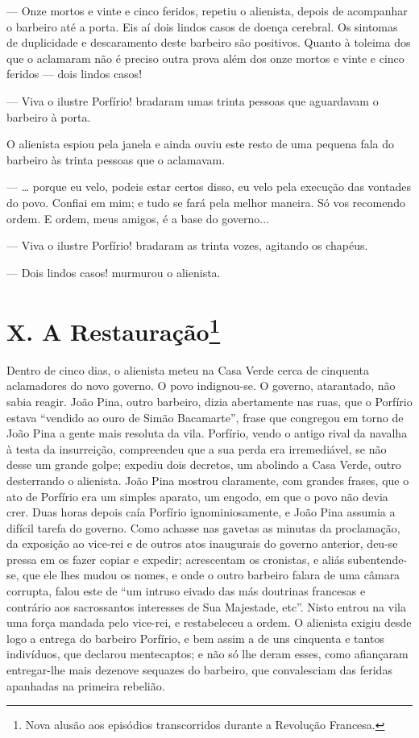 --- Onze mortos e vinte e cinco feridos, repetiu o alienista, depois de
acompanhar o barbeiro até a porta. Eis aí dois lindos casos de doença
cerebral. Os sintomas de duplicidade e descaramento deste barbeiro são
positivos. Quanto à toleima dos que o aclamaram não é preciso outra
prova além dos onze mortos e vinte e cinco feridos --- dois lindos
casos!

--- Viva o ilustre Porfírio! bradaram umas trinta pessoas que aguardavam
o barbeiro à porta.

O alienista espiou pela janela e ainda ouviu este resto de uma pequena
fala do barbeiro às trinta pessoas que o aclamavam.

--- \ldots{} porque eu velo, podeis estar certos disso, eu velo pela
execução das vontades do povo. Confiai em mim; e tudo se fará pela
melhor maneira. Só vos recomendo ordem. E ordem, meus amigos, é a base
do governo...

--- Viva o ilustre Porfírio! bradaram as trinta vozes, agitando os
chapéus.

--- Dois lindos casos! murmurou o alienista.

\chapter{X. A Restauração\footnote{Nova alusão aos episódios transcorridos
  durante a Revolução Francesa.}}

Dentro de cinco dias, o alienista meteu na Casa Verde cerca de cinquenta
aclamadores do novo governo. O povo indignou-se. O governo, atarantado,
não sabia reagir. João Pina, outro barbeiro, dizia abertamente nas ruas,
que o Porfírio estava ``vendido ao ouro de Simão Bacamarte'', frase que
congregou em torno de João Pina a gente mais resoluta da vila. Porfírio,
vendo o antigo rival da navalha à testa da insurreição, compreendeu que
a sua perda era irremediável, se não desse um grande golpe; expediu dois
decretos, um abolindo a Casa Verde, outro desterrando o alienista. João
Pina mostrou claramente, com grandes frases, que o ato de Porfírio era
um simples aparato, um engodo, em que o povo não devia crer. Duas horas
depois caía Porfírio ignominiosamente, e João Pina assumia a difícil
tarefa do governo. Como achasse nas gavetas as minutas da proclamação,
da exposição ao vice-rei e de outros atos inaugurais do governo
anterior, deu-se pressa em os fazer copiar e expedir; acrescentam os
cronistas, e aliás subentende-se, que ele lhes mudou os nomes, e onde o
outro barbeiro falara de uma câmara corrupta, falou este de ``um intruso
eivado das más doutrinas francesas e contrário aos sacrossantos
interesses de Sua Majestade, etc''. Nisto entrou na vila uma força
mandada pelo vice-rei, e restabeleceu a ordem. O alienista exigiu desde
logo a entrega do barbeiro Porfírio, e bem assim a de uns cinquenta e
tantos indivíduos, que declarou mentecaptos; e não só lhe deram esses,
como afiançaram entregar-lhe mais dezenove sequazes do barbeiro, que
convalesciam das feridas apanhadas na primeira rebelião.

